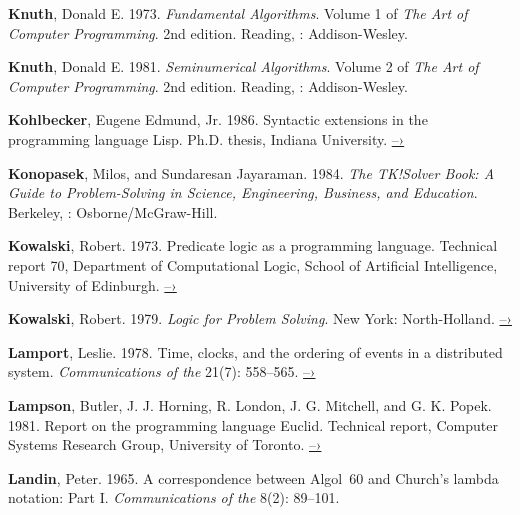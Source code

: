  \label{Knuth (1973)}
\textbf{Knuth}, Donald E.  1973.  \textit{Fundamental Algorithms}. Volume 1 of \textit{The
Art of Computer Programming}.  2nd edition. Reading, : Addison-Wesley.

 \label{Knuth 1981}
\textbf{Knuth}, Donald E.  1981.  \textit{Seminumerical Algorithms}. Volume 2 of \textit{The
Art of Computer Programming}.  2nd edition. Reading, : Addison-Wesley.

 \label{Kohlbecker 1986}
\textbf{Kohlbecker}, Eugene Edmund, Jr. 1986.  Syntactic extensions in the programming
language Lisp.  Ph.D. thesis, Indiana University.
\href{http://www.ccs.neu.edu/scheme/pubs/dissertation-kohlbecker.pdf}{–›}

 \label{Konopasek and Jayaraman 1984}
\textbf{Konopasek}, Milos, and Sundaresan Jayaraman.  1984.  \textit{The TK!Solver Book: A
Guide to Problem-Solving in Science, Engineering, Business, and
Education}. Berkeley, : Osborne/McGraw-Hill.

 \label{Kowalski (1973; 1979)}
\textbf{Kowalski}, Robert.  1973.  Predicate logic as a programming language.  Technical
report 70, Department of Computational Logic, School of Artificial
Intelligence, University of Edinburgh.
\href{http://www.doc.ic.ac.uk/~rak/papers/IFIP\%2074.pdf}{–›}

\textbf{Kowalski}, Robert.  1979.  \textit{Logic for Problem Solving}. New York:
North-Holland.
\href{http://www.doc.ic.ac.uk/\%7Erak/papers/LogicForProblemSolving.pdf}{–›}

 \label{Lamport (1978)}
\textbf{Lamport}, Leslie. 1978.  Time, clocks, and the ordering of events in a
distributed system.  \textit{Communications of the } 21(7): 558--565.
\href{http://research.microsoft.com/en-us/um/people/lamport/pubs/time-clocks.pdf}{–›}

 \label{Lampson et al. 1981}
\textbf{Lampson}, Butler, J. J. Horning, R.  London, J. G. Mitchell, and G. K.  Popek.
1981.  Report on the programming language Euclid.  Technical report, Computer
Systems Research Group, University of Toronto.
\href{http://www.bitsavers.org/pdf/xerox/parc/techReports/CSL-81-12_Report_On_The_Programming_Language_Euclid.pdf}{–›}

 \label{Landin (1965)}
\textbf{Landin}, Peter.  1965.  A correspondence between Algol~60 and Church’s lambda
notation: Part I.  \textit{Communications of the } 8(2): 89--101.


